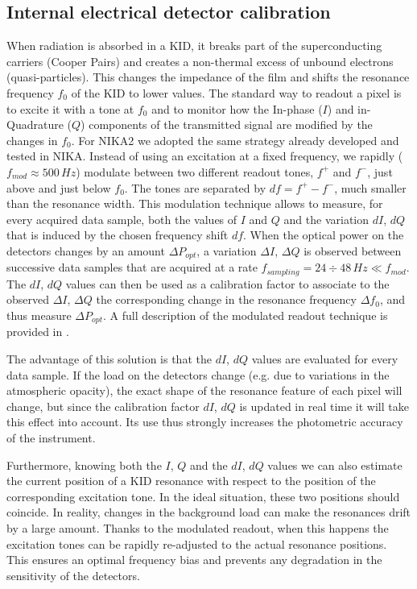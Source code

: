\documentclass[]{aa} %
\begin{document}
\subsection{Internal electrical detector calibration}
\label{Internal detectors calibration}
When radiation is absorbed in a KID, it breaks part of the superconducting carriers (Cooper Pairs) and creates a non-thermal excess of unbound electrons (quasi-particles). This changes the impedance of the film and shifts the resonance frequency $f_0$ of the KID to lower values.
The standard way to readout a pixel is to excite it with a tone at $f_0$ and to monitor how the In-phase ($I$) and in-Quadrature ($Q$) components of the transmitted signal are modified by the changes in $f_0$. For NIKA2 we adopted the same strategy already developed and tested in NIKA. Instead of using an excitation at a fixed frequency, we rapidly ($f_{mod} \approx 500\,Hz$) modulate between two different readout tones, $f^+$ and $f^-$, just above and just below $f_0$. The tones are separated by $df=f^+-f^-$, much smaller than the resonance width. This modulation technique allows to measure, for every acquired data sample, both the values of $I$ and $Q$ and the variation $dI$, $dQ$ that is induced by the chosen frequency shift $df$. When the optical power on the detectors changes by an amount $\Delta P_{opt}$, a variation $\Delta I$, $\Delta Q$ is observed between successive data samples that are acquired at a rate $f_{sampling} = 24\div48\,Hz \ll  f_{mod} $. The $dI$, $dQ$ values can then be used as a calibration factor to associate to the observed $\Delta I$, $\Delta Q$ the corresponding change in the resonance frequency $\Delta f_0$, and thus measure $\Delta P_{opt}$. A full description of the modulated readout technique is provided in \cite{Calvo2013}.

The advantage of this solution is that the $dI$, $dQ$ values are evaluated for every data sample. If the load on the detectors change (e.g. due to variations in the atmospheric opacity), the exact shape of the resonance feature of each pixel will change, but since the calibration factor $dI$, $dQ$ is updated in real time it will take this effect into account. Its use thus strongly increases the photometric accuracy of the instrument.

Furthermore, knowing both the $I$, $Q$ and the $dI$, $dQ$ values we can also estimate the current position of a KID resonance with respect to the position of the corresponding excitation tone. In the ideal situation, these two positions should coincide. In reality, changes in the background load can make the resonances drift by a large amount. Thanks to the modulated readout, when this happens the excitation tones can be rapidly re-adjusted to the actual resonance positions. This ensures an optimal frequency bias and prevents any degradation in the sensitivity of the detectors.
\end{document}
